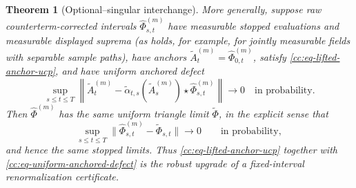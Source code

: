 \documentclass[10pt,reqno]{amsart}
\theoremstyle{plain}
\newtheorem{theorem}{Theorem}[section]
\theoremstyle{definition}
\theoremstyle{remark}
\begin{document}
\begin{theorem}[Optional--singular interchange]
More generally, suppose raw counterterm-corrected intervals
\(\widehat\Phi^{(m)}_{s,t}\) have measurable stopped evaluations and
measurable displayed suprema (as holds, for example, for jointly measurable
fields with separable sample paths), have anchors
\(\widetilde A^{(m)}_t=\widehat\Phi^{(m)}_{0,t}\), satisfy
\eqref{cc:eq-lifted-anchor-ucp}, and have uniform anchored defect
\begin{equation}
 \sup_{s\le t\le T}
 \left\|
 \widetilde A^{(m)}_t-
 \widetilde\alpha_{t,s}(\widetilde A^{(m)}_s)
   \star\widehat\Phi^{(m)}_{s,t}
 \right\|
 \longrightarrow0
 \quad\text{in probability}.
 \label{cc:eq-uniform-anchored-defect}
\end{equation}
Then \(\widehat\Phi^{(m)}\) has the same uniform triangle limit
\(\widetilde\Phi\), in the explicit sense that
\[
 \sup_{s\le t\le T}
 \|\widehat\Phi^{(m)}_{s,t}-\widetilde\Phi_{s,t}\|
 \longrightarrow0
 \qquad\text{in probability},
\]
and hence the same stopped limits.  Thus
\eqref{cc:eq-lifted-anchor-ucp} together with
\eqref{cc:eq-uniform-anchored-defect} is the robust upgrade of a
fixed-interval renormalization certificate.
\end{theorem}
\end{document}
